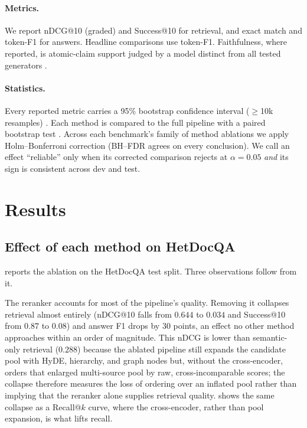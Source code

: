 \documentclass[10pt,twocolumn]{article}
\begin{document}
\paragraph{Metrics.}
We report nDCG@10 (graded) \cite{jarvelin2002ndcg} and Success@10 for retrieval,
and exact match and token-F1 for answers. Headline comparisons use token-F1.
Faithfulness, where reported, is atomic-claim support judged by a model distinct
from all tested generators \cite{zheng2023llmjudge,min2023factscore,es2024ragas}.

\paragraph{Statistics.}
Every reported metric carries a 95\% bootstrap confidence interval ($\ge$10k
resamples) \cite{efron1979bootstrap}. Each method is compared to the full
pipeline with a paired bootstrap test \cite{smucker2007sigtest}. Across each
benchmark's family of method ablations we apply Holm--Bonferroni correction
\cite{holm1979} (BH--FDR \cite{benjamini1995fdr} agrees on every conclusion). We
call an effect ``reliable'' only when its corrected comparison rejects at
$\alpha{=}0.05$ \emph{and} its sign is consistent across dev and test.

\section{Results}\label{sec:results}
\subsection{Effect of each method on HetDocQA}
 reports the ablation on the HetDocQA test split. Three
observations follow from it.

The reranker accounts for most of the pipeline's quality. Removing it collapses
retrieval almost entirely (nDCG@10 falls from $0.644$ to $0.034$ and Success@10
from $0.87$ to $0.08$) and answer F1 drops by 30 points, an effect no other
method approaches within an order of magnitude. This nDCG is lower than
semantic-only retrieval ($0.288$) because the ablated pipeline still expands the
candidate pool with HyDE, hierarchy, and graph nodes but, without the
cross-encoder, orders that enlarged multi-source pool by raw, cross-incomparable
scores; the collapse therefore measures the loss of ordering over an inflated
pool rather than implying that the reranker alone supplies retrieval quality.
 shows the
same collapse as a Recall@$k$ curve, where the cross-encoder, rather than pool
expansion, is what lifts recall.
\end{document}
